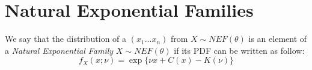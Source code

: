 \section{Natural Exponential Families}
\begin{defi}
	We say that the distribution of a \rs $(x_1...x_n)$ from $X\sim NEF(\theta)$ is an element of a \textit{Natural Exponential Family}	$X\sim NEF(\theta)$ if its PDF can be written as follow:
	$$f_X(x;\nu)=\exp \{ \nu x + C(x) -K(\nu) \}$$
\end{defi}


